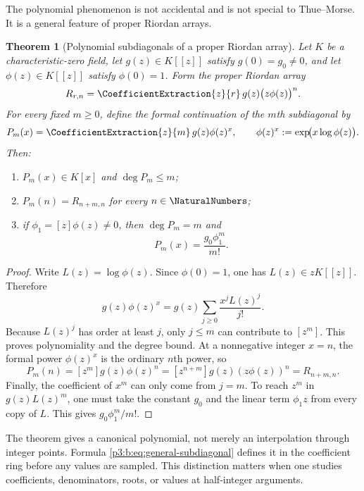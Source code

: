 \documentclass[11pt,oneside]{article}
\numberwithin{equation}{section}
\newtheorem{theorem}{Theorem}[section]
\theoremstyle{definition}
\theoremstyle{remark}
\begin{document}
The polynomial phenomenon is not accidental and is not special to
Thue--Morse.  It is a general feature of proper Riordan arrays.

\begin{theorem}[Polynomial subdiagonals of a proper Riordan array]
\label{p3:b:thm:general-riordan-diagonal}
Let $K$ be a characteristic-zero field, let
$g(z)\in K[[z]]$ satisfy $g(0)=g_0\ne0$, and let
$\phi(z)\in K[[z]]$ satisfy $\phi(0)=1$.  Form the proper Riordan array
\[
 R_{r,n}=\CoefficientExtraction{z}{r}\,{g(z)\bigl(z\phi(z)\bigr)^n}.
\]
For every fixed $m\ge0$, define the formal continuation of the $m$th
subdiagonal by
\begin{equation}
 P_m(x)=\CoefficientExtraction{z}{m}\,{g(z)\phi(z)^x},
 \qquad
 \phi(z)^x:=\exp\!\bigl(x\log\phi(z)\bigr).
 \label{p3:b:eq:general-subdiagonal}
\end{equation}
Then:
\begin{enumerate}
 \item $P_m(x)\in K[x]$ and $\deg P_m\le m$;
 \item $P_m(n)=R_{n+m,n}$ for every $n\in\NaturalNumbers$;
 \item if $\phi_1=[z]\phi(z)\ne0$, then $\deg P_m=m$ and
 \begin{equation}
  [x^m]P_m(x)=\frac{g_0\phi_1^m}{m!}.
  \label{p3:b:eq:general-leading}
 \end{equation}
\end{enumerate}
\end{theorem}

\begin{proof}
Write $L(z)=\log\phi(z)$.  Since $\phi(0)=1$, one has
$L(z)\in zK[[z]]$.  Therefore
\[
 g(z)\phi(z)^x
 =g(z)\sum_{j\ge0}\frac{x^jL(z)^j}{j!}.
\]
Because $L(z)^j$ has order at least $j$, only $j\le m$ can contribute to
$[z^m]$.  This proves polynomiality and the degree bound.  At a
nonnegative integer $x=n$, the formal power $\phi(z)^x$ is the ordinary
$n$th power, so
\[
 P_m(n)=[z^m]g(z)\phi(z)^n
       =[z^{n+m}]g(z)(z\phi(z))^n
       =R_{n+m,n}.
\]
Finally, the coefficient of $x^m$ can only come from $j=m$.  To reach
$z^m$ in $g(z)L(z)^m$, one must take the constant $g_0$ and the linear term
$\phi_1z$ from every copy of $L$.  This gives
$g_0\phi_1^m/m!$.
\end{proof}

\begin{remark}
The theorem gives a canonical polynomial, not merely an interpolation through
integer points.  Formula \eqref{p3:b:eq:general-subdiagonal} defines it in the
coefficient ring before any values are sampled.  This distinction matters
when one studies coefficients, denominators, roots, or values at half-integer
arguments.
\end{remark}
\end{document}
